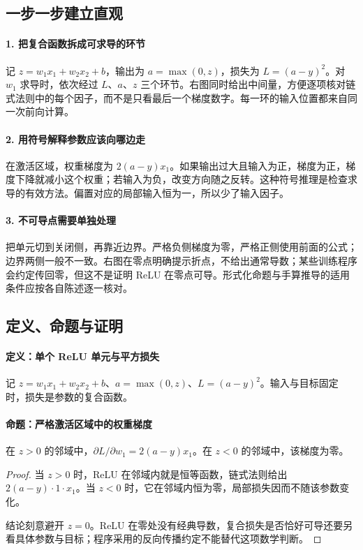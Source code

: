 \subsection*{一步一步建立直观}

\paragraph{1. 把复合函数拆成可求导的环节}

记 $z=w_1x_1+w_2x_2+b$，输出为 $a=\max(0,z)$，损失为 $L=(a-y)^2$。对 $w_1$ 求导时，依次经过 $L$、$a$、$z$ 三个环节。右图同时给出中间量，方便逐项核对链式法则中的每个因子，而不是只看最后一个梯度数字。每一环的输入位置都来自同一次前向计算。



\paragraph{2. 用符号解释参数应该向哪边走}

在激活区域，权重梯度为 $2(a-y)x_1$。如果输出过大且输入为正，梯度为正，梯度下降就减小这个权重；若输入为负，改变方向随之反转。这种符号推理是检查求导的有效方法。偏置对应的局部输入恒为一，所以少了输入因子。



\paragraph{3. 不可导点需要单独处理}

把单元切到关闭侧，再靠近边界。严格负侧梯度为零，严格正侧使用前面的公式；边界两侧一般不一致。右图在零点明确提示折点，不给出通常导数；某些训练程序会约定传回零，但这不是证明 ReLU 在零点可导。形式化命题与手算推导的适用条件应按各自陈述逐一核对。



\subsection*{定义、命题与证明}

\paragraph{定义：单个 ReLU 单元与平方损失}

记 $z=w_1x_1+w_2x_2+b$、$a=\max(0,z)$、$L=(a-y)^2$。输入与目标固定时，损失是参数的复合函数。

\paragraph{命题：严格激活区域中的权重梯度}

在 $z>0$ 的邻域中，$\partial L/\partial w_1=2(a-y)x_1$。在 $z<0$ 的邻域中，该梯度为零。

\begin{proof}

当 $z>0$ 时，ReLU 在邻域内就是恒等函数，链式法则给出 $2(a-y)\cdot1\cdot x_1$。当 $z<0$ 时，它在邻域内恒为零，局部损失因而不随该参数变化。

结论刻意避开 $z=0$。ReLU 在零处没有经典导数，复合损失是否恰好可导还要另看具体参数与目标；程序采用的反向传播约定不能替代这项数学判断。

\end{proof}
